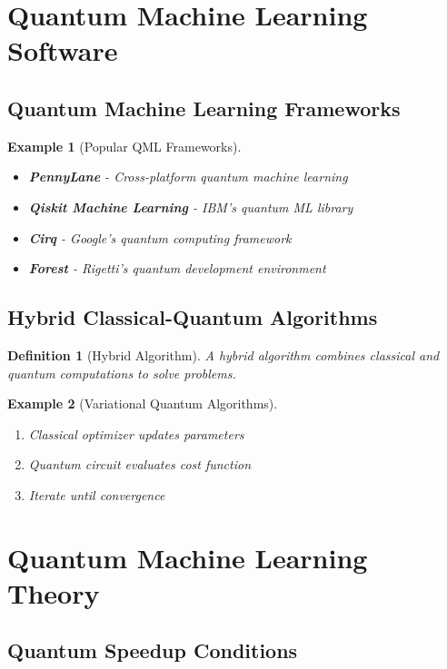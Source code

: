 \documentclass[11pt]{article}
\newtheorem{definition}{Definition}[section]
\newtheorem{example}{Example}[section]
\begin{document}
\section{Quantum Machine Learning Software}

\subsection{Quantum Machine Learning Frameworks}

\begin{example}[Popular QML Frameworks]
\begin{itemize}
    \item \textbf{PennyLane} - Cross-platform quantum machine learning
    \item \textbf{Qiskit Machine Learning} - IBM's quantum ML library
    \item \textbf{Cirq} - Google's quantum computing framework
    \item \textbf{Forest} - Rigetti's quantum development environment
\end{itemize}
\end{example}

\subsection{Hybrid Classical-Quantum Algorithms}

\begin{definition}[Hybrid Algorithm]
A hybrid algorithm combines classical and quantum computations to solve problems.
\end{definition}

\begin{example}[Variational Quantum Algorithms]
\begin{enumerate}
    \item Classical optimizer updates parameters
    \item Quantum circuit evaluates cost function
    \item Iterate until convergence
\end{enumerate}
\end{example}

\section{Quantum Machine Learning Theory}

\subsection{Quantum Speedup Conditions}
\end{document}
